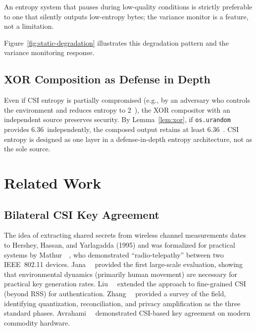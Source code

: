 An entropy system that pauses during low-quality conditions is strictly preferable to one that silently outputs low-entropy bytes; the variance monitor is a feature, not a limitation.

Figure~\ref{fig:static-degradation} illustrates this degradation pattern and the variance monitoring response.



\subsection{XOR Composition as Defense in Depth}
\label{subsec:xor-defense}

Even if CSI entropy is partially compromised (e.g., by an adversary who controls the environment and reduces entropy to 2~\bpb), the XOR compositor with an independent source preserves security.
By Lemma~\ref{lem:xor}, if \texttt{os.urandom} provides 6.36~\bpb independently, the composed output retains at least 6.36~\bpb.
CSI entropy is designed as one layer in a defense-in-depth entropy architecture, not as the sole source.


\section{Related Work}
\label{sec:related}

\subsection{Bilateral CSI Key Agreement}
\label{subsec:related-bilateral}

The idea of extracting shared secrets from wireless channel measurements dates to Hershey, Hassan, and Yarlagadda (1995) and was formalized for practical systems by Mathur~\etal~\cite{mathur2008radio}, who demonstrated ``radio-telepathy'' between two IEEE~802.11 devices.
Jana~\etal~\cite{jana2009effectiveness} provided the first large-scale evaluation, showing that environmental dynamics (primarily human movement) are necessary for practical key generation rates.
Liu~\etal~\cite{liu2012exploiting} extended the approach to fine-grained CSI (beyond RSS) for authentication.
Zhang~\etal~\cite{zhang2016csikey} provided a survey of the field, identifying quantization, reconciliation, and privacy amplification as the three standard phases.
Avrahami~\etal~\cite{avrahami2023csi} demonstrated CSI-based key agreement on modern commodity hardware.

